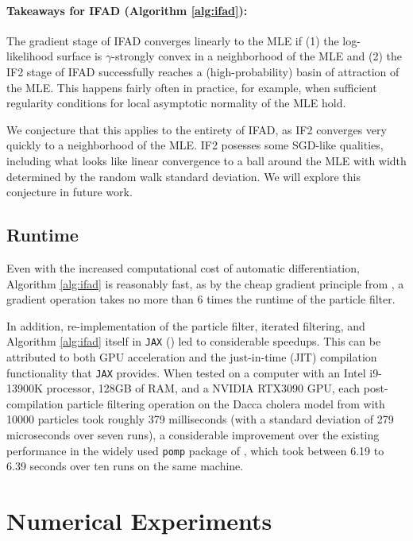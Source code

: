 \documentclass{article}
\begin{document}
\paragraph{Takeaways for IFAD (Algorithm \ref{alg:ifad}):}

The gradient stage of IFAD converges linearly to the MLE if (1) the log-likelihood surface is $\gamma$-strongly convex in a neighborhood of the MLE and (2) the IF2 stage of IFAD successfully reaches a (high-probability) basin of attraction of the MLE. This happens fairly often in practice, for example, when sufficient regularity conditions for local asymptotic normality of the MLE hold.

We conjecture that this applies to the entirety of IFAD, as IF2 converges very quickly to a neighborhood of the MLE. IF2 posesses some SGD-like qualities, including what looks like linear convergence to a ball around the MLE with width determined by the random walk standard deviation. We will explore this conjecture in future work.

\subsection{Runtime}

Even with the increased computational cost of automatic differentiation, Algorithm \ref{alg:ifad} is reasonably fast, as by the cheap gradient principle from \cite{kakade2019provably}, a gradient operation takes no more than 6 times the runtime of the particle filter. 

In addition, re-implementation of the particle filter, iterated filtering, and Algorithm \ref{alg:ifad} itself in \texttt{JAX} (\cite{jax2018github}) led to considerable speedups. This can be attributed to both GPU acceleration and the just-in-time (JIT) compilation functionality that \texttt{JAX} provides. When tested on a computer with an Intel i9-13900K processor, 128GB of RAM, and a NVIDIA RTX3090 GPU, each post-compilation particle filtering operation on the Dacca cholera model from \cite{king08} with 10000 particles took roughly 379 milliseconds (with a standard deviation of 279 microseconds over seven runs), a considerable improvement over the existing performance in the widely used \texttt{pomp} package of \cite{king2016pomp}, which took between 6.19 to 6.39 seconds over ten runs on the same machine.




\section{Numerical Experiments}
\end{document}
